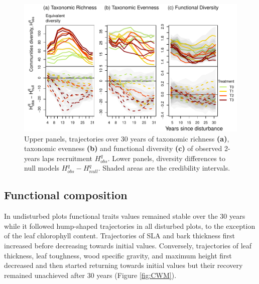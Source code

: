 \documentclass[fleqn,10pt]{ArtEcoFoG} %
\begin{document}
\begin{figure}

{\centering \includegraphics{RecruitmentTrajectories_files/figure-latex/DivTraj-1} 

}

\caption{Upper panels, trajectories over 30 years of taxonomic richness \textbf{(a)}, taxonomic evenness \textbf{(b)} and functional diversity \textbf{(c)} of observed 2-years laps recruitment $H_{obs}^q$. Lower panels, diversity differences to null models $H_{obs}^q - H_{null}^q$. Shaded areas are the credibility intervals.}\label{fig:DivTraj}
\end{figure}

\subsection{Functional composition}\label{functional-composition}

In undisturbed plots functional traits values remained stable over the
30 years while it followed hump-shaped trajectories in all disturbed
plots, to the exception of the leaf chlorophyll content. Trajectories of
SLA and bark thickness first increased before decreasing towards initial
values. Conversely, trajectories of leaf thickness, leaf toughness, wood
specific gravity, and maximum height first decreased and then started
returning towards initial values but their recovery remained unachieved
after 30 years (Figure \ref{fig:CWM}).
\end{document}
